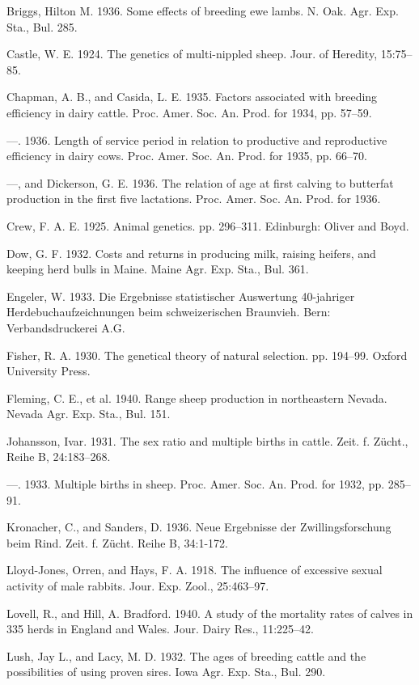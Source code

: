\begin{hangparas}{0.5in}{1}%
Briggs, Hilton M. 1936. Some effects of breeding ewe lambs. N. Oak. Agr. Exp.
Sta., Bul. 285.

Castle, W. E. 1924. The genetics of multi-nippled sheep. Jour. of Heredity, 15:75--85.

Chapman, A. B., and Casida, L. E. 1935. Factors associated with breeding efficiency
in dairy cattle. Proc. Amer. Soc. An. Prod. for 1934, pp. 57--59.

---. 1936. Length of service period in relation to productive and reproductive
efficiency in dairy cows. Proc. Amer. Soc. An. Prod. for 1935, pp. 66--70.

---, and Dickerson, G. E. 1936. The relation of age at first calving to
butterfat production in the first five lactations. Proc. Amer. Soc. An. Prod.
for 1936.

Crew, F. A. E. 1925. Animal genetics. pp. 296--311. Edinburgh: Oliver and Boyd.

Dow, G. F. 1932. Costs and returns in producing milk, raising heifers, and keeping
herd bulls in Maine. Maine Agr. Exp. Sta., Bul. 361.

Engeler, W. 1933. Die Ergebnisse statistischer Auswertung 40-jahriger Herdebuchaufzeichnungen
beim schweizerischen Braunvieh. Bern: Verbandsdruckerei A.G.

Fisher, R. A. 1930. The genetical theory of natural selection. pp. 194--99. Oxford
University Press.

Fleming, C. E., et al. 1940. Range sheep production in northeastern Nevada. Nevada
Agr. Exp. Sta., Bul. 151.

Johansson, Ivar. 1931. The sex ratio and multiple births in cattle. Zeit. f. Z\"ucht.,
Reihe B, 24:183--268.

---. 1933. Multiple births in sheep. Proc. Amer. Soc. An. Prod. for 1932,
pp. 285--91.

Kronacher, C., and Sanders, D. 1936. Neue Ergebnisse der Zwillingsforschung beim
Rind. Zeit. f. Z\"ucht. Reihe B, 34:1-172.

Lloyd-Jones, Orren, and Hays, F. A. 1918. The influence of excessive sexual activity
of male rabbits. Jour. Exp. Zool., 25:463--97.

Lovell, R., and Hill, A. Bradford. 1940. A study of the mortality rates of calves in
335 herds in England and Wales. Jour. Dairy Res., 11:225--42.

Lush, Jay L., and Lacy, M. D. 1932. The ages of breeding cattle and the possibilities
of using proven sires. Iowa Agr. Exp. Sta., Bul. 290.


\end{hangparas}
